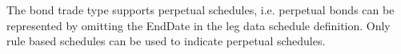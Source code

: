 The bond trade type supports perpetual schedules, i.e. perpetual bonds can be represented by omitting the EndDate in the
leg data schedule definition. Only rule based schedules can be used to indicate perpetual schedules.

